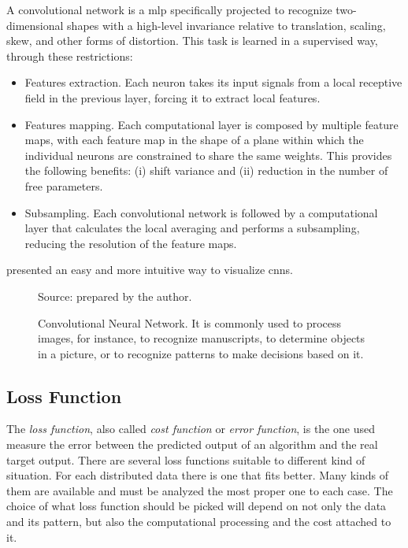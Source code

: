 A convolutional network is a \gls*{mlp} specifically projected to recognize two-dimensional shapes with a high-level invariance relative to translation, scaling, skew, and other forms of distortion. This task is learned in a supervised way, through these restrictions:
%
\begin{itemize}
    \item Features extraction. Each neuron takes its input signals from a local receptive field in the previous layer, forcing it to extract local features.
    \item Features mapping. Each computational layer is composed by multiple feature maps, with each feature map in the shape of a plane within which the individual neurons are constrained to share the same weights. This provides the following benefits: (i) shift variance and (ii) reduction in the number of free parameters.
    \item Subsampling. Each convolutional network is followed by a computational layer that calculates the local averaging and performs a subsampling, reducing the resolution of the feature maps.
\end{itemize}
%
\citet{wang2021} presented an easy and more intuitive way to visualize \gls*{cnn}s.
%
\begin{figure}[!htb]\scriptsize
    \centering
    \caption[Convolutional Neural Network]{Convolutional Neural Network. It is commonly used to process images, for instance, to recognize manuscripts, to determine objects in a picture, or to recognize patterns to make decisions based on it.}
    
    \begin{flushleft}\footnotesize
        Source: prepared by the author.
    \end{flushleft}
\end{figure}



\subsection{Loss Function}\label{sec:loss_function}

The \emph{loss function}, also called \emph{cost function} or \emph{error function}, is the one used measure the error between the predicted output of an algorithm and the real target output. 
There are several loss functions suitable to different kind of situation. 
For each distributed data there is one that fits better.
Many kinds of them are available and must be analyzed the most proper one to each case. 
The choice of what loss function should be picked will depend on not only the data and its pattern, but also the computational processing and the cost attached to it.


